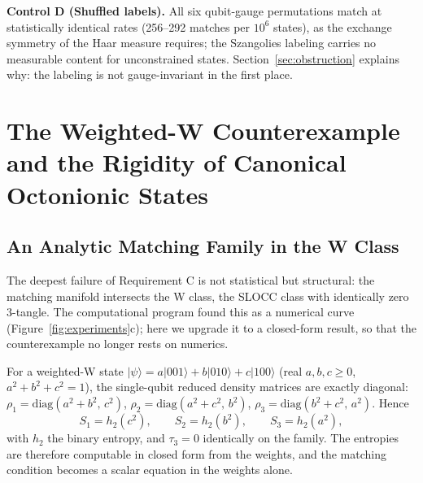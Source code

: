 \documentclass[11pt]{article}
\begin{document}
\textbf{Control D (Shuffled labels).} All six qubit-gauge permutations match at statistically identical rates (256--292 matches per $10^6$ states), as the exchange symmetry of the Haar measure requires; the Szangolies labeling carries no measurable content for unconstrained states. Section~\ref{sec:obstruction} explains why: the labeling is not gauge-invariant in the first place.

\section{The Weighted-W Counterexample and the Rigidity of Canonical Octonionic States}
\label{sec:wclass}

\subsection{An Analytic Matching Family in the W Class}
\label{sec:wfamily}

The deepest failure of Requirement C is not statistical but structural: the matching manifold intersects the W class, the SLOCC class with identically zero 3-tangle. The computational program found this as a numerical curve (Figure~\ref{fig:experiments}c); here we upgrade it to a closed-form result, so that the counterexample no longer rests on numerics.

For a weighted-W state $|\psi\rangle = a|001\rangle + b|010\rangle + c|100\rangle$ (real $a, b, c \ge 0$, $a^2 + b^2 + c^2 = 1$), the single-qubit reduced density matrices are exactly diagonal: $\rho_1 = \mathrm{diag}(a^2 + b^2,\, c^2)$, $\rho_2 = \mathrm{diag}(a^2 + c^2,\, b^2)$, $\rho_3 = \mathrm{diag}(b^2 + c^2,\, a^2)$. Hence
\[
S_1 = h_2(c^2), \qquad S_2 = h_2(b^2), \qquad S_3 = h_2(a^2),
\]
with $h_2$ the binary entropy, and $\tau_3 = 0$ identically on the family. The entropies are therefore computable in closed form from the weights, and the matching condition becomes a scalar equation in the weights alone.
\end{document}
